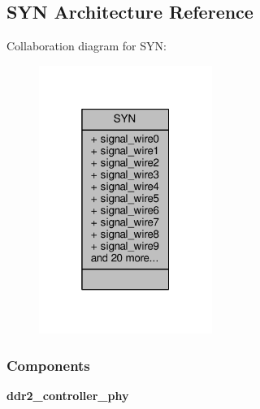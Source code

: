 \subsection{S\+YN Architecture Reference}
\label{classddr2_1_1SYN}


Collaboration diagram for S\+YN\+:\nopagebreak
\begin{figure}[H]
\begin{center}
\leavevmode
\includegraphics[width=160pt]{d5/d1f/classddr2_1_1SYN__coll__graph}
\end{center}
\end{figure}
\subsubsection*{Components}
 \begin{DoxyCompactItemize}
\item 
{\bf ddr2\+\_\+controller\+\_\+phy}  {\bfseries }  
\end{DoxyCompactItemize}
